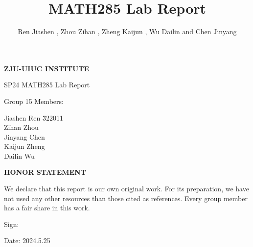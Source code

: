 \documentclass{article}
\title{MATH285 Lab Report}
\author{Ren Jiashen , Zhou Zihan , Zheng Kaijun , Wu Dailin and Chen Jinyang}
\begin{document}
\begin{titlepage}
    \centering
    \vspace*{2cm}
    
    \Huge
    \textbf{ZJU-UIUC INSTITUTE}
    
    \vspace{0.5cm}
    \LARGE
    SP24 MATH285 Lab Report
    
    \vspace{1.5cm}
    
    \Large
    Group 15 Members:
    
    \vspace{0.5cm}
    \begin{minipage}{0.6\textwidth}
    \centering
    \begin{tabbing}
    Jiashen Ren \hspace{2cm} \= 322011 \\
    Zihan Zhou  \\
    Jinyang Chen  \\
    Kaijun Zheng  \\
    Dailin Wu  \\
    \end{tabbing}
    \end{minipage}

    \vspace{2cm}
    
    \Large
    \textbf{HONOR STATEMENT}
    
    \vspace{0.5cm}
    
    \normalsize
    We declare that this report is our own original work. For its preparation, we have not used any other resources than those cited as references. Every group member has a fair share in this work.
    
    \vspace{2cm}
    
    \begin{flushleft}
    \large
    Sign:
    
    \vspace{1.5cm}
    
    Date: 2024.5.25
    \end{flushleft}
    
\end{titlepage}

\maketitle
\end{document}
